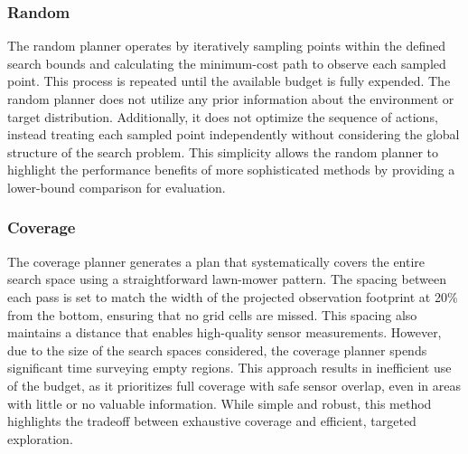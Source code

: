 \subsubsection{Random}

The random planner operates by iteratively sampling points within the defined search bounds and calculating the minimum-cost path to observe each sampled point. This process is repeated until the available budget is fully expended. The random planner does not utilize any prior information about the environment or target distribution. Additionally, it does not optimize the sequence of actions, instead treating each sampled point independently without considering the global structure of the search problem. This simplicity allows the random planner to highlight the performance benefits of more sophisticated methods by providing a lower-bound comparison for evaluation.

\subsubsection{Coverage}

The coverage planner generates a plan that systematically covers the entire search space using a straightforward lawn-mower pattern. The spacing between each pass is set to match the width of the projected observation footprint at 20\% from the bottom, ensuring that no grid cells are missed. This spacing also maintains a distance that enables high-quality sensor measurements. However, due to the size of the search spaces considered, the coverage planner spends significant time surveying empty regions. This approach results in inefficient use of the budget, as it prioritizes full coverage with safe sensor overlap, even in areas with little or no valuable information. While simple and robust, this method highlights the tradeoff between exhaustive coverage and efficient, targeted exploration.


